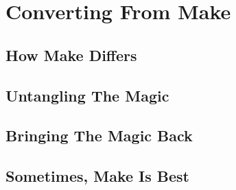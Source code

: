 \chapter{Converting From Make}
\label{chapter:Converting}



\section{How Make Differs}


\section{Untangling The Magic}


\section{Bringing The Magic Back}


\section{Sometimes, Make Is Best}




